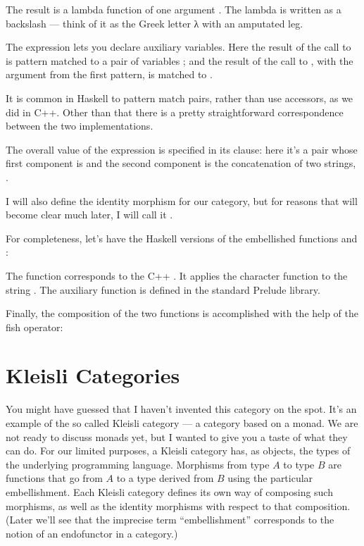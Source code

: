 The result is a lambda function of one argument . The lambda
is written as a backslash --- think of it as the Greek letter λ with an
amputated leg.

The  expression lets you declare auxiliary variables. Here
the result of the call to  is pattern matched to a pair of
variables ; and the result of the call to ,
with the argument  from the first pattern, is matched to
.

It is common in Haskell to pattern match pairs, rather than use
accessors, as we did in C++. Other than that there is a pretty
straightforward correspondence between the two implementations.

The overall value of the  expression is specified in its
 clause: here it's a pair whose first component is 
and the second component is the concatenation of two strings,
.

I will also define the identity morphism for our category, but for
reasons that will become clear much later, I will call it
.

For completeness, let's have the Haskell versions of the embellished
functions  and :

The function  corresponds to the C++ . It
applies the character function  to the string
. The auxiliary function  is defined in the
standard Prelude library.

Finally, the composition of the two functions is accomplished with the
help of the fish operator:


\section{Kleisli Categories}

You might have guessed that I haven't invented this category on the
spot. It's an example of the so called Kleisli category --- a category
based on a monad. We are not ready to discuss monads yet, but I wanted
to give you a taste of what they can do. For our limited purposes, a
Kleisli category has, as objects, the types of the underlying
programming language. Morphisms from type $A$ to type $B$ are functions that
go from $A$ to a type derived from $B$ using the particular embellishment.
Each Kleisli category defines its own way of composing such morphisms,
as well as the identity morphisms with respect to that composition.
(Later we'll see that the imprecise term ``embellishment'' corresponds
to the notion of an endofunctor in a category.)

